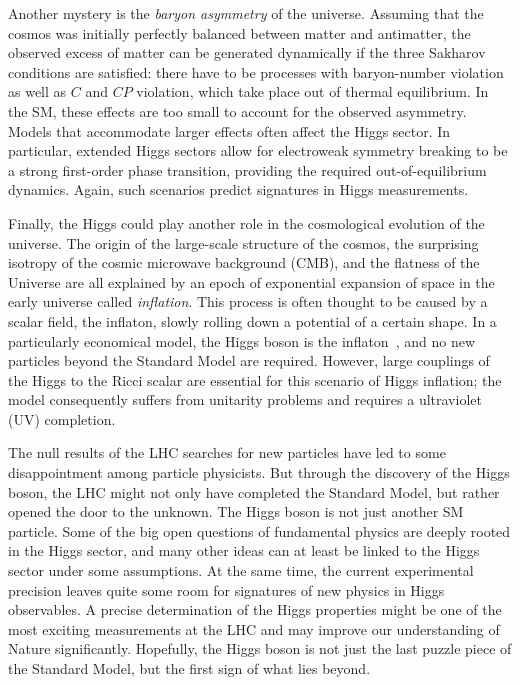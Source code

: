 Another mystery is the \emph{baryon asymmetry} of the
universe. Assuming that the cosmos was initially perfectly balanced
between matter and antimatter, the observed excess of matter can be
generated dynamically if the three Sakharov conditions are satisfied:
there have to be processes with baryon-number violation as well as $C$
and $CP$ violation, which take place out of thermal equilibrium. In
the SM, these effects are too small to account for the observed
asymmetry. Models that accommodate larger effects often affect the
Higgs sector. In particular, extended Higgs sectors allow for
electroweak symmetry breaking to be a strong first-order phase
transition, providing the required out-of-equilibrium dynamics. Again,
such scenarios predict signatures in Higgs measurements.

Finally, the Higgs could play another role in the cosmological
evolution of the universe. The origin of the large-scale structure of
the cosmos, the surprising isotropy of the cosmic microwave background
(CMB), and the flatness of the Universe are all explained by an epoch
of exponential expansion of space in the early universe called
\emph{inflation}. This process is often thought to be caused by a
scalar field, the inflaton, slowly rolling down a potential of a
certain shape. In a particularly economical model, the Higgs boson is
the inflaton~\cite{Bezrukov:2007ep}, and no new particles beyond the
Standard Model are required. However, large couplings of the Higgs to
the Ricci scalar are essential for this scenario of Higgs inflation;
the model consequently suffers from unitarity problems and requires a
ultraviolet (UV) completion.

\newparagraph
%
The null results of the LHC searches for new particles have led to
some disappointment among particle physicists. But through the
discovery of the Higgs boson, the LHC might not only have completed
the Standard Model, but rather opened the door to the unknown. The
Higgs boson is not just another SM particle. Some of the big open
questions of fundamental physics are deeply rooted in the Higgs
sector, and many other ideas can at least be linked to the Higgs
sector under some assumptions. At the same time, the current
experimental precision leaves quite some room for signatures of new
physics in Higgs observables. A precise determination of the Higgs
properties might be one of the most exciting measurements at the LHC
and may improve our understanding of Nature significantly. Hopefully,
the Higgs boson is not just the last puzzle piece of the Standard
Model, but the first sign of what lies beyond.



